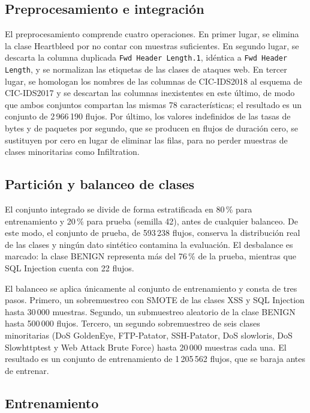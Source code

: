 \subsection{Preprocesamiento e integración}

El preprocesamiento comprende cuatro operaciones. En primer lugar, se elimina la clase Heartbleed por no contar con muestras suficientes. En segundo lugar, se descarta la columna duplicada \texttt{Fwd Header Length.1}, idéntica a \texttt{Fwd Header Length}, y se normalizan las etiquetas de las clases de ataques web. En tercer lugar, se homologan los nombres de las columnas de CIC-IDS2018 al esquema de CIC-IDS2017 y se descartan las columnas inexistentes en este último, de modo que ambos conjuntos compartan las mismas 78 características; el resultado es un conjunto de 2\,966\,190 flujos. Por último, los valores indefinidos de las tasas de bytes y de paquetes por segundo, que se producen en flujos de duración cero, se sustituyen por cero en lugar de eliminar las filas, para no perder muestras de clases minoritarias como Infiltration.

\subsection{Partición y balanceo de clases}

El conjunto integrado se divide de forma estratificada en 80\,\% para entrenamiento y 20\,\% para prueba (semilla 42), antes de cualquier balanceo. De este modo, el conjunto de prueba, de 593\,238 flujos, conserva la distribución real de las clases y ningún dato sintético contamina la evaluación. El desbalance es marcado: la clase BENIGN representa más del 76\,\% de la prueba, mientras que SQL Injection cuenta con 22 flujos.

El balanceo se aplica únicamente al conjunto de entrenamiento y consta de tres pasos. Primero, un sobremuestreo con SMOTE \parencite{chawla2002} de las clases XSS y SQL Injection hasta 30\,000 muestras. Segundo, un submuestreo aleatorio de la clase BENIGN hasta 500\,000 flujos. Tercero, un segundo sobremuestreo de seis clases minoritarias (DoS GoldenEye, FTP-Patator, SSH-Patator, DoS slowloris, DoS Slowhttptest y Web Attack Brute Force) hasta 20\,000 muestras cada una. El resultado es un conjunto de entrenamiento de 1\,205\,562 flujos, que se baraja antes de entrenar.

\subsection{Entrenamiento}

